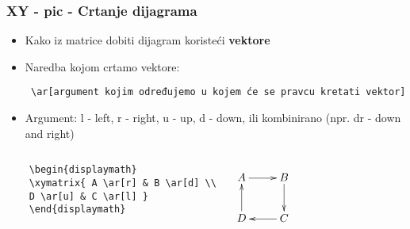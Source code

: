 \documentclass[9pt]{beamer}
\begin{document}
\begin{frame}[fragile]
\frametitle{XY - pic - Crtanje dijagrama}

\begin{itemize}
	\item Kako iz matrice dobiti dijagram koristeći \textbf{vektore}
	\item Naredba kojom crtamo vektore:
	\begin{verbatim} \ar[argument kojim određujemo u kojem će se pravcu kretati vektor]\end{verbatim}
	\item Argument: l - left, r - right, u - up, d - down, ili kombinirano (npr. dr - down and right)
\end{itemize}

\begin{columns}
	\begin{verbatim} 
	\begin{displaymath}
	\xymatrix{ A \ar[r] & B \ar[d] \\
	D \ar[u] & C \ar[l] }
	\end{displaymath}
	\end{verbatim}
	
	\begin{displaymath}
	\xymatrix{ A \ar[r] & B \ar[d] \\
		D \ar[u] & C \ar[l] }
	\end{displaymath}
\end{columns}

\end{frame}
\end{document}
